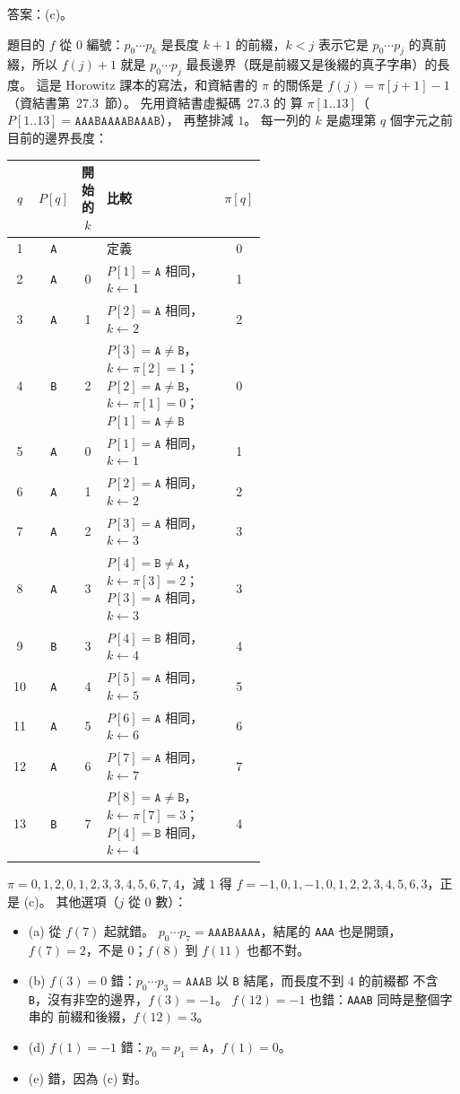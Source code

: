 \begin{pastsoln}
答案：(c)。

題目的 $f$ 從 $0$ 編號：$p_0 \cdots p_k$ 是長度 $k + 1$ 的前綴，$k < j$ 表示它是 $p_0 \cdots p_j$
的真前綴，所以 $f(j) + 1$ 就是 $p_0 \cdots p_j$ 最長邊界（既是前綴又是後綴的真子字串）的長度。
這是 Horowitz 課本的寫法，和資結書的 $\pi$ 的關係是 $f(j) = \pi[j + 1] - 1$（資結書第~27.3~節）。
先用資結書虛擬碼~27.3 的  算 $\pi[1..13]$（$P[1..13] = \mathtt{AAABAAAABAAAB}$），
再整排減 $1$。 每一列的 $k$ 是處理第 $q$ 個字元之前目前的邊界長度：
\begin{center}
\small
\begin{tabular}{ccc>{\raggedright\arraybackslash}p{0.56\linewidth}c}
\toprule
$q$ & $P[q]$ & 開始的 $k$ & 比較 & $\pi[q]$ \\
\midrule
1 & \texttt{A} & & 定義 & 0 \\
2 & \texttt{A} & 0 & $P[1]=\mathtt{A}$ 相同，$k\gets1$ & 1 \\
3 & \texttt{A} & 1 & $P[2]=\mathtt{A}$ 相同，$k\gets2$ & 2 \\
4 & \texttt{B} & 2 & $P[3]=\mathtt{A}\ne\mathtt{B}$，$k\gets\pi[2]=1$；$P[2]=\mathtt{A}\ne\mathtt{B}$，$k\gets\pi[1]=0$；$P[1]=\mathtt{A}\ne\mathtt{B}$ & 0 \\
5 & \texttt{A} & 0 & $P[1]=\mathtt{A}$ 相同，$k\gets1$ & 1 \\
6 & \texttt{A} & 1 & $P[2]=\mathtt{A}$ 相同，$k\gets2$ & 2 \\
7 & \texttt{A} & 2 & $P[3]=\mathtt{A}$ 相同，$k\gets3$ & 3 \\
8 & \texttt{A} & 3 & $P[4]=\mathtt{B}\ne\mathtt{A}$，$k\gets\pi[3]=2$；$P[3]=\mathtt{A}$ 相同，$k\gets3$ & 3 \\
9 & \texttt{B} & 3 & $P[4]=\mathtt{B}$ 相同，$k\gets4$ & 4 \\
10 & \texttt{A} & 4 & $P[5]=\mathtt{A}$ 相同，$k\gets5$ & 5 \\
11 & \texttt{A} & 5 & $P[6]=\mathtt{A}$ 相同，$k\gets6$ & 6 \\
12 & \texttt{A} & 6 & $P[7]=\mathtt{A}$ 相同，$k\gets7$ & 7 \\
13 & \texttt{B} & 7 & $P[8]=\mathtt{A}\ne\mathtt{B}$，$k\gets\pi[7]=3$；$P[4]=\mathtt{B}$ 相同，$k\gets4$ & 4 \\
\bottomrule
\end{tabular}
\end{center}
$\pi = 0, 1, 2, 0, 1, 2, 3, 3, 4, 5, 6, 7, 4$，減 $1$ 得
$f = -1, 0, 1, -1, 0, 1, 2, 2, 3, 4, 5, 6, 3$，正是 (c)。 其他選項（$j$ 從 $0$ 數）：
\begin{itemize}
\item (a) 從 $f(7)$ 起就錯。 $p_0 \cdots p_7 = \mathtt{AAABAAAA}$，結尾的 \texttt{AAA} 也是開頭，
$f(7) = 2$，不是 $0$；$f(8)$ 到 $f(11)$ 也都不對。
\item (b) $f(3) = 0$ 錯：$p_0 \cdots p_3 = \mathtt{AAAB}$ 以 \texttt{B} 結尾，而長度不到 $4$ 的前綴都
不含 \texttt{B}，沒有非空的邊界，$f(3) = -1$。 $f(12) = -1$ 也錯：\texttt{AAAB} 同時是整個字串的
前綴和後綴，$f(12) = 3$。
\item (d) $f(1) = -1$ 錯：$p_0 = p_1 = \mathtt{A}$，$f(1) = 0$。
\item (e) 錯，因為 (c) 對。
\end{itemize}
\end{pastsoln}
